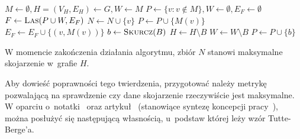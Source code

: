 {\begin{algorithm}
\begin{algorithmic}[1]
        \State $M \gets \emptyset, H=(V_H, E_H) \gets G, W \gets M$
        \State $P \gets \{v: v \notin M\}, W \gets \emptyset, E_F \gets \emptyset$\label{init_edmonds}
        \State $F \gets \Call{Las}{P \cup W, E_F}$
        \label{pick_edge}
        \EndIf
        \label{put_matched_in_odd}
          \State $N \gets N \cup \{v\}$
          \State $P \gets P \cup \{M(v)\}$
          \State $E_F \gets E_F \cup \{(v, M(v))\}$
        \label{even_connected}
          \State $b \gets \Call{Skurcz}{B}$
          \State $H \gets H\setminus B$
          \State $W \gets W\setminus B$
          \State $P \gets P \cup \{b\}$
        \label{even_disjoint}
          \State{}
        \EndIf
      \EndFunction
    \end{algorithmic}
  \end{algorithm}
  \begin{theorem}
    W momencie zakończenia działania algorytmu, zbiór $N$ stanowi maksymalne skojarzenie w~grafie $H$.
  \end{theorem}
  Aby dowieść poprawności tego twierdzenia, przygotować należy metrykę pozwalającą na sprawdzenie czy dane skojarzenie rzeczywiście jest maksymalne.
  W oparciu o~notatki~\cite{Tutte-Berge:notes} oraz artykuł~\cite{cohen:hal-00358468} (stanowiące syntezę koncepcji pracy~\cite{Tutte-Berge:original}),  można posłużyć się następującą własnością, u~podstaw której leży wzór Tutte-Berge'a.

}
